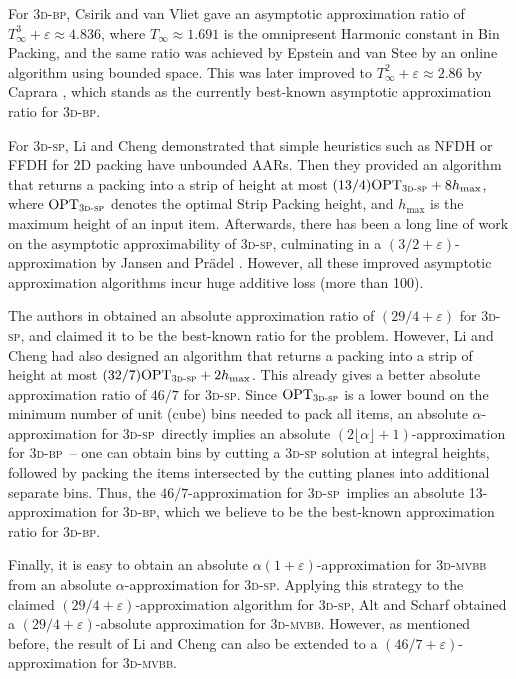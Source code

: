 \documentclass[a4paper,UKenglish,cleveref, autoref, thm-restate]{lipics-v2021}
\newcommand{\eps}{\varepsilon}
\newcommand{\opt}{\mathrm{OPT}}
\newcommand{\tbp}{\textsc{3d-bp}\xspace}
\newcommand{\tsp}{\textsc{3d-sp}\xspace}
\newcommand{\tmvc}{\textsc{3d-mvbb}\xspace}
\begin{document}
For \tbp, Csirik and van Vliet \cite{csirik1993line} gave an asymptotic approximation ratio of $T_{\infty}^3 + \eps \approx 4.836$, where $T_{\infty} \approx 1.691$ is the omnipresent  Harmonic constant \cite{LeeL85} in Bin Packing, and the same ratio was achieved by Epstein and van Stee \cite{epstein2004optimal} by an online algorithm using bounded space. 
This was later improved to $T_{\infty}^2 + \eps\approx 2.86$ by Caprara \cite{caprara2008packing}, which stands as the currently best-known asymptotic approximation ratio for \tbp. 

For \tsp, Li and Cheng \cite{li-cheng} demonstrated that simple heuristics such as NFDH or FFDH for 2D packing \cite{coffman1980performance} have unbounded AARs. Then they provided an algorithm that returns a packing into a strip of height at most $(13/4)\opt_{\tsp}+8{h_{\max}}$, where $\opt_{\tsp}$ denotes the optimal Strip Packing height, and ${h_{\max}}$ is the maximum height of an input item. 
Afterwards, there has been a long line of work \cite{li-cheng,li1992heuristic,miyazawa2004packing,miyazawa1997algorithm,jansen2006asymptotic,bansal2007harmonic} on the asymptotic approximability of \tsp, culminating in a $(3/2+\varepsilon)$-approximation by Jansen and Pr{\"a}del \cite{3d-strip-packing}. However, all these improved asymptotic approximation algorithms incur huge additive loss (more than 100). 

The authors in \cite{3d-knapsack-diedrich} obtained an absolute approximation ratio of $(29/4+\varepsilon)$ for \tsp, and claimed it to be the best-known ratio for the problem. However, Li and Cheng \cite{li-cheng} had also designed an algorithm that returns a packing into a strip of height at most $(32/7)\opt_{\tsp}+2{h_{\max}}$. 
This already gives a better absolute approximation ratio of $46/7$ for \tsp.
Since $\opt_{\tsp}$ is a lower bound on the minimum number of unit (cube) bins needed to pack all items, an absolute $\alpha$-approximation for \tsp~directly implies an absolute $(2\lfloor \alpha \rfloor +1)$-approximation for \tbp~-- one can obtain bins by cutting a \tsp solution at integral heights, followed by packing the items intersected by the cutting planes into additional separate bins. Thus, the $46/7$-approximation for \tsp~implies an absolute 13-approximation for \tbp, which we believe to be the best-known approximation ratio for \tbp. 

Finally, it is easy to obtain an absolute $\alpha(1+\varepsilon)$-approximation for \tmvc from an absolute $\alpha$-approximation for \tsp.  Applying this strategy to the claimed $(29/4+\varepsilon)$-approximation algorithm for \tsp \cite{3d-knapsack-diedrich}, Alt and Scharf \cite{alt2018approximating} obtained a $(29/4+\varepsilon)$-absolute approximation for \tmvc. However, as mentioned before, the result of Li and Cheng \cite{li-cheng} can also be extended to a $(46/7+\varepsilon)$-approximation for \tmvc.
\end{document}
